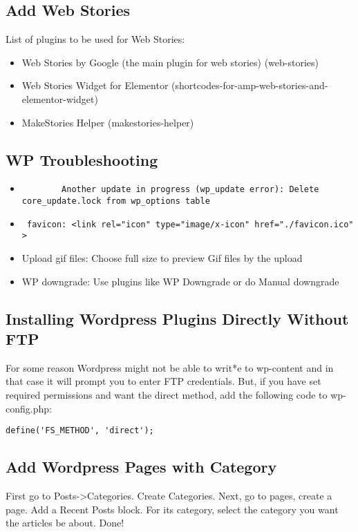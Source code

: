 \documentclass{article}
\begin{document}
\subsection{Add Web Stories}
List of plugins to be used for Web Stories:
\begin{itemize}
	\item Web Stories by Google (the main plugin for web stories) (web-stories)
	\item Web Stories Widget for Elementor (shortcodes-for-amp-web-stories-and-elementor-widget)
	\item MakeStories Helper (makestories-helper)
	
\end{itemize}
\subsection{WP Troubleshooting}
\begin{itemize}
	\item \begin{verbatim}
		Another update in progress (wp_update error): Delete core_update.lock from wp_options table 
	\end{verbatim}
	\item \begin{verbatim} favicon: <link rel="icon" type="image/x-icon" href="./favicon.ico" > \end{verbatim}
	\item Upload gif files: Choose full size to preview Gif files by the upload 
	\item WP downgrade: Use plugins like WP Downgrade or do Manual downgrade
\end{itemize}
\subsection{Installing Wordpress Plugins Directly Without FTP}
For some reason Wordpress might not be able to writ*e to wp-content and in that case it will prompt you to enter FTP credentials. But, if you have set required permissions and want the direct method, add the following code to wp-config.php:
\begin{verbatim}
define('FS_METHOD', 'direct');
\end{verbatim}

\subsection{Add Wordpress Pages with Category}
First go to Posts->Categories. Create Categories. 
Next, go to pages, create a page. Add a Recent Posts block. For its category, select the category you want the articles be about. Done!
\end{document}
